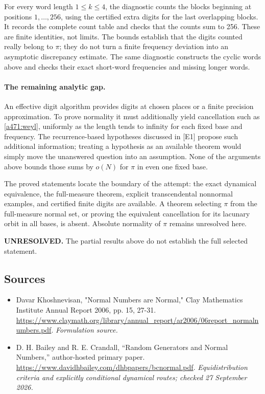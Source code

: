 \documentclass[11pt]{article}
\begin{document}
For every word length $1\leq k\leq4$, the diagnostic counts the blocks beginning at positions $1,\ldots,256$, using the certified extra digits for the last overlapping blocks. It records the complete count table and checks that the counts sum to 256. These are finite identities, not limits. The bounds establish that the digits counted really belong to $\pi$; they do not turn a finite frequency deviation into an asymptotic discrepancy estimate. The same diagnostic constructs the cyclic words above and checks their exact short-word frequencies and missing longer words.

\paragraph{The remaining analytic gap.}
An effective digit algorithm provides digits at chosen places or a finite precision approximation. To prove normality it must additionally yield cancellation such as \eqref{a471:weyl}, uniformly as the length tends to infinity for each fixed base and frequency. The recurrence-based hypotheses discussed in [E1] propose such additional information; treating a hypothesis as an available theorem would simply move the unanswered question into an assumption. None of the arguments above bounds those sums by $o(N)$ for $\pi$ in even one fixed base.

The proved statements locate the boundary of the attempt: the exact dynamical equivalence, the full-measure theorem, explicit transcendental nonnormal examples, and certified finite digits are available. A theorem selecting $\pi$ from the full-measure normal set, or proving the equivalent cancellation for its lacunary orbit in all bases, is absent. Absolute normality of $\pi$ remains unresolved here.

\textbf{UNRESOLVED.} The partial results above do not establish the full selected statement.

\subsection{Sources}
\begin{itemize}
\item[S1]Davar Khoshnevisan, "Normal Numbers are Normal," Clay Mathematics Institute Annual Report 2006, pp. 15, 27-31.
\url{https://www.claymath.org/library/annual_report/ar2006/06report_normalnumbers.pdf}.
\textit{Formulation source.}
\item[E1] D. H. Bailey and R. E. Crandall, ``Random Generators and Normal Numbers,'' author-hosted primary paper.
\url{https://www.davidhbailey.com/dhbpapers/bcnormal.pdf}.
\textit{Equidistribution criteria and explicitly conditional dynamical routes; checked 27 September 2026.}
\end{itemize}
\end{document}
